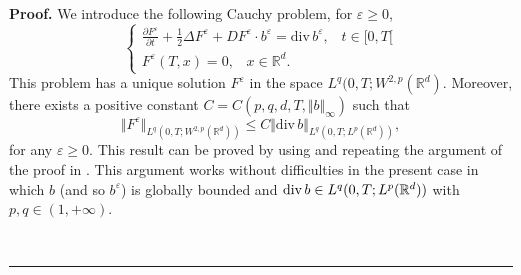 \documentclass{article}
\newcommand{\eps}{\varepsilon}
\newenvironment{proof}[1][Proof]{\noindent\textbf{#1.} }{\ \rule{0.5em}{0.5em}}
\begin{document}
\begin{proof}
We introduce the following Cauchy problem, for $\eps \ge 0$,
\begin{equation}
\left\{ \begin{aligned} \frac{\partial F^{\eps}}{\partial t}+
\frac{1}{2} \Delta F^{\eps} + D F^{\eps} \cdot b^{\eps}
={\mathrm{div}\, }b^{\eps}, \;\;
\; t \in [0,T[ \\ F^{\eps}(T,x)=0,\;\;\; x \in \mathbb{R} ^d. \end{aligned}%
\right.   \label{equa1}
\end{equation}
  This  problem
 has a unique solution $F^{\eps}$ in the space
 $L^{q}(0,T;W^{2,p}(\mathbb{ R}^{d})$. Moreover,
there exists a positive constant $C=C(p,q,
 d,T,\Vert b\Vert _{\infty
})$ such that
\begin{equation}
\Vert F^{\eps}\Vert _{L^{q}(0,T;W^{2,p}(\mathbb{ R}^{d})) }\leq
C\Vert
 \mathrm{div \,}b \Vert _{L^{q}(0,T;L^{p}(\mathbb{
R}^{d}))},  \label{bond5}
\end{equation}
for any $\eps \ge 0$.  This result  can be proved by using
\cite[Theorem 1.2]{Kr1}  and repeating the
 argument  of the proof
 in \cite[Theorem 10.3]{Kry-Ro}. This argument  works without
difficulties in the present case in which $b$ (and so $b^{\eps}$) is
globally bounded and $\mathrm{div \,}b \in
L^{q}(0,T;L^{p}(\mathbb{%
R}^{d}))$ with  $p, q \in (1, + \infty)$.


\end{proof}
\end{document}
